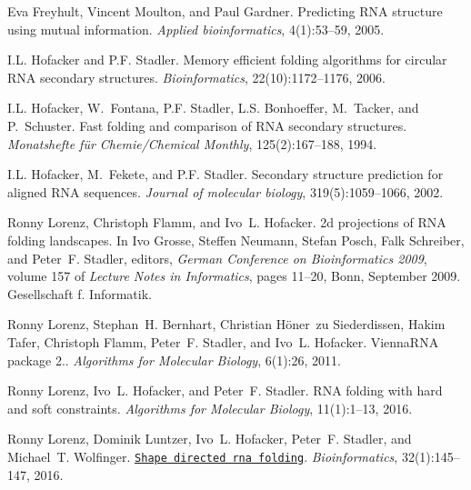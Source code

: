 \begin{DoxyDescription}
\item[\label{_CITEREF_freyhult:2005}%
\mbox{[}9\mbox{]}]Eva Freyhult, Vincent Moulton, and Paul Gardner. Predicting R\+NA structure using mutual information. {\itshape Applied bioinformatics}, 4(1)\+:53--59, 2005.


\item[\label{_CITEREF_hofacker:2006}%
\mbox{[}10\mbox{]}]I.\+L. Hofacker and P.\+F. Stadler. Memory efficient folding algorithms for circular R\+NA secondary structures. {\itshape Bioinformatics}, 22(10)\+:1172--1176, 2006.


\item[\label{_CITEREF_hofacker:1994}%
\mbox{[}11\mbox{]}]I.\+L. Hofacker, W.~Fontana, P.\+F. Stadler, L.\+S. Bonhoeffer, M.~Tacker, and P.~Schuster. Fast folding and comparison of R\+NA secondary structures. {\itshape Monatshefte f\"{u}r Chemie/\+Chemical Monthly}, 125(2)\+:167--188, 1994.


\item[\label{_CITEREF_hofacker:2002}%
\mbox{[}12\mbox{]}]I.\+L. Hofacker, M.~Fekete, and P.\+F. Stadler. Secondary structure prediction for aligned R\+NA sequences. {\itshape Journal of molecular biology}, 319(5)\+:1059--1066, 2002.


\item[\label{_CITEREF_lorenz:2009}%
\mbox{[}13\mbox{]}]Ronny Lorenz, Christoph Flamm, and Ivo~L. Hofacker. 2d projections of R\+NA folding landscapes. In Ivo Grosse, Steffen Neumann, Stefan Posch, Falk Schreiber, and Peter~F. Stadler, editors, {\itshape German Conference on Bioinformatics 2009}, volume 157 of {\itshape Lecture Notes in Informatics}, pages 11--20, Bonn, September 2009. Gesellschaft f. Informatik.


\item[\label{_CITEREF_lorenz:2011}%
\mbox{[}14\mbox{]}]Ronny Lorenz, Stephan~H. Bernhart, Christian H\"{o}ner~zu Siederdissen, Hakim Tafer, Christoph Flamm, Peter~F. Stadler, and Ivo~L. Hofacker. Vienna\+R\+NA package 2.. {\itshape Algorithms for Molecular Biology}, 6(1)\+:26, 2011. 


\item[\label{_CITEREF_lorenz:2016b}%
\mbox{[}15\mbox{]}]Ronny Lorenz, Ivo~L. Hofacker, and Peter~F. Stadler. R\+NA folding with hard and soft constraints. {\itshape Algorithms for Molecular Biology}, 11(1)\+:1--13, 2016. 


\item[\label{_CITEREF_lorenz:2016a}%
\mbox{[}16\mbox{]}]Ronny Lorenz, Dominik Luntzer, Ivo~L. Hofacker, Peter~F. Stadler, and Michael~T. Wolfinger. \href{http://bioinformatics.oxfordjournals.org/content/32/1/145.abstract}{\tt Shape directed rna folding}. {\itshape Bioinformatics}, 32(1)\+:145--147, 2016. 



\end{DoxyDescription}
